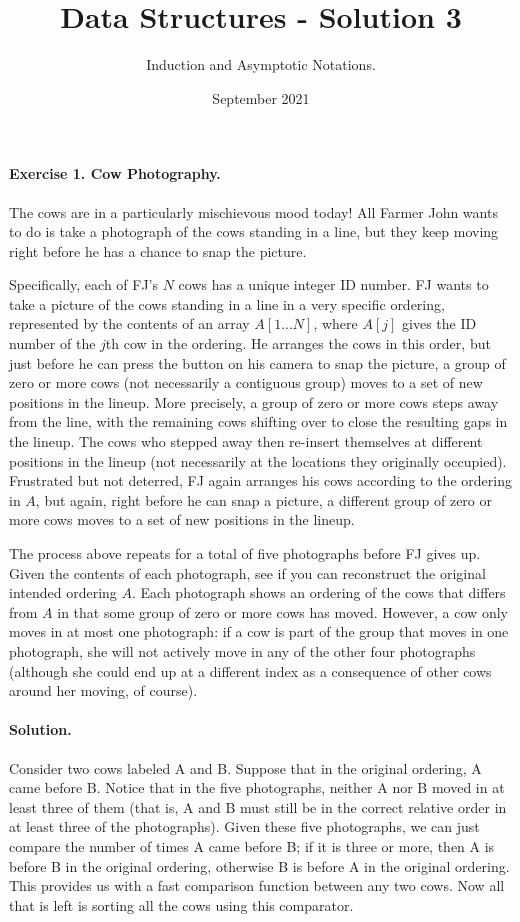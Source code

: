 
\title{Data Structures - Solution 3} 
\author{Induction and Asymptotic Notations.}
\date{September 2021}



\paragraph{Exercise 1. Cow Photography.}
The cows are in a particularly mischievous mood today!  All Farmer John
wants to do is take a photograph of the cows standing in a line, but they
keep moving right before he has a chance to snap the picture.

Specifically, each of FJ's \(N\)  cows has a unique
integer ID number.  FJ wants to take a picture of the cows standing in
a line in a very specific ordering, represented by the contents of an
array \( A[1...N]\), where \( A[j]\) gives the ID number of the \(j\)th cow in the
ordering.  He arranges the cows in this order, but just before he can
press the button on his camera to snap the picture, a group of zero or
more cows (not necessarily a contiguous group) moves to a set of new
positions in the lineup.  More precisely, a group of zero or more cows
steps away from the line, with the remaining cows shifting over to
close the resulting gaps in the lineup.  The cows who stepped away
then re-insert themselves at different positions in the lineup (not
necessarily at the locations they originally occupied).  Frustrated
but not deterred, FJ again arranges his cows according to the ordering
in \(A\), but again, right before he can snap a picture, a different group
of zero or more cows moves to a set of new positions in the lineup.

The process above repeats for a total of five photographs before FJ gives
up.  Given the contents of each photograph, see if you can reconstruct the
original intended ordering \(A\).  Each photograph shows an ordering of the
cows that differs from \(A\) in that some group of zero or more cows has moved.
However, a cow only moves in at most one photograph: if a cow is part of
the group that moves in one photograph, she will not actively move in any
of the other four photographs (although she could end up at a different
index as a consequence of other cows around her moving, of course).

\paragraph{Solution.} Consider two cows labeled A and B. Suppose that in the original ordering, A came before B. Notice that in the five photographs, neither A nor B moved in at least three of them (that is, A and B must still be in the correct relative order in at least three of the photographs). Given these five photographs, we can just compare the number of times A came before B; if it is three or more, then A is before B in the original ordering, otherwise B is before A in the original ordering. This provides us with a fast comparison function between any two cows. Now all that is left is sorting all the cows using this comparator.

